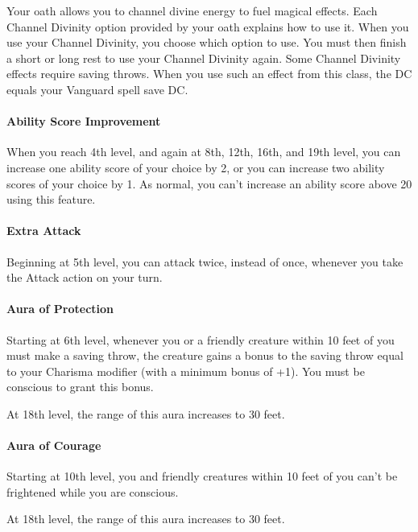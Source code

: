 Your oath allows you to channel divine energy to fuel magical effects.
Each Channel Divinity option provided by your oath explains how to use
it. When you use your Channel Divinity, you choose which option to use.
You must then finish a short or long rest to use your Channel Divinity
again. Some Channel Divinity effects require saving throws. When you use
such an effect from this class, the DC equals your Vanguard spell save
DC.

\paragraph{Ability Score Improvement}\label{vanguard-feature-asi}

When you reach 4th level, and again at 8th, 12th, 16th, and 19th level,
you can increase one ability score of your choice by 2, or you can
increase two ability scores of your choice by 1. As normal, you can't
increase an ability score above 20 using this feature.

\paragraph{Extra Attack}\label{vanguard-feature-extra-attack}

Beginning at 5th level, you can attack twice, instead of once, whenever
you take the Attack action on your turn.

\paragraph{Aura of
Protection}\label{vanguard-feature-aura-of-protection}

Starting at 6th level, whenever you or a friendly creature within 10
feet of you must make a saving throw, the creature gains a bonus to the
saving throw equal to your Charisma modifier (with a minimum bonus of
+1). You must be conscious to grant this bonus.

At 18th level, the range of this aura increases to 30 feet.

\paragraph{Aura of Courage}\label{vanguard-feature-aura-of-courage}

Starting at 10th level, you and friendly creatures within 10 feet of you
can't be frightened while you are conscious.

At 18th level, the range of this aura increases to 30 feet.

